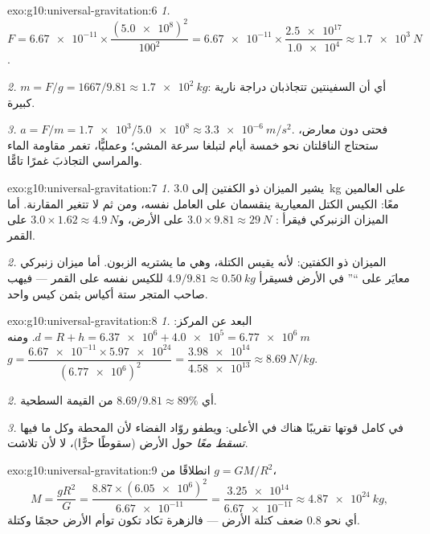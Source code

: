 \begin{solution}{exo:g10:universal-gravitation:6}
\emph{1.} $F = \num{6.67e-11} \times
\dfrac{(\num{5.0e8})^2}{100^2}
= \num{6.67e-11} \times \dfrac{\num{2.5e17}}{\num{1.0e4}}
\approx \qty{1.7e3}{N}$.

\emph{2.} $m = F/g = 1667/9.81 \approx \qty{1.7e2}{kg}$: أي أن السفينتين
تتجاذبان  دراجة نارية كبيرة.

\emph{3.} $a = F/m = \num{1.7e3}/\num{5.0e8} \approx
\qty{3.3e-6}{m/s^2}$. فحتى دون معارض، ستحتاج الناقلتان نحو
خمسة أيام لتبلغا سرعة المشي؛ وعمليًّا، تغمر مقاومة الماء والمراسي
التجاذبَ غمرًا تامًّا.
\end{solution}

\begin{solution}{exo:g10:universal-gravitation:7}
\emph{1.} يشير الميزان ذو الكفتين إلى \qty{3.0}{kg} على العالمين معًا: 
الكيس  الكتل المعيارية ينقسمان على العامل نفسه،
ومن ثم لا تتغير المقارنة. أما الميزان الزنبركي فيقرأ
: $3.0 \times 9.81 \approx \qty{29}{N}$ على الأرض،
و$3.0 \times 1.62 \approx \qty{4.9}{N}$ على القمر.

\emph{2.} الميزان ذو الكفتين: لأنه يقيس الكتلة، وهي ما يشتريه
الزبون. أما ميزان زنبركي معايَر على ``'' في الأرض فسيقرأ
$4.9/9.81 \approx \qty{0.50}{kg}$ للكيس نفسه على القمر ---
فيهب صاحب المتجر ستة أكياس بثمن كيس واحد.
\end{solution}

\begin{solution}{exo:g10:universal-gravitation:8}
\emph{1.} البعد عن المركز:
$d = R + h = \num{6.37e6} + \num{4.0e5} = \qty{6.77e6}{m}$. ومنه
$g = \dfrac{\num{6.67e-11} \times \num{5.97e24}}{(\num{6.77e6})^2}
= \dfrac{\num{3.98e14}}{\num{4.58e13}} \approx \qty{8.69}{N/kg}$.

\emph{2.} أي $8.69/9.81 \approx 89\%$ من القيمة السطحية.

\emph{3.}  في كامل قوتها تقريبًا هناك في الأعلى: ويطفو روّاد الفضاء
لأن المحطة وكل ما فيها \emph{تسقط معًا}
حول الأرض (سقوطًا حرًّا)، لا لأن 
تلاشت.
\end{solution}

\begin{solution}{exo:g10:universal-gravitation:9}
انطلاقًا من $g = GM/R^2$،
\[
M = \frac{g R^2}{G}
= \frac{8.87 \times (\num{6.05e6})^2}{\num{6.67e-11}}
= \frac{\num{3.25e14}}{\num{6.67e-11}}
\approx \qty{4.87e24}{kg},
\]
أي نحو $0.8$ ضعف كتلة الأرض --- فالزهرة تكاد تكون توأم
الأرض حجمًا وكتلة.
\end{solution}

